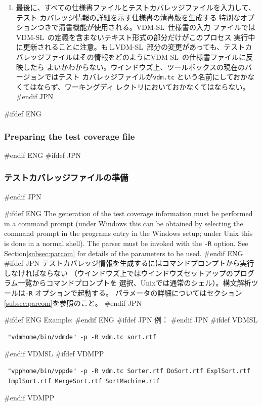 \documentclass[\pformat,12pt]{article}
\newcommand{\vdmslpp}{VDM-SL}
\newcommand{\vdmslpp}{VDM++}
\begin{document}
\begin{enumerate}
\item
  最後に、すべての仕様書ファイルとテストカバレッジファイルを入力して、テスト
  カバレッジ情報の詳細を示す仕様書の清書版を生成する
  特別なオプションつきで清書機能が使用される。\vdmslpp\ 仕様書の入力
  ファイルでは\vdmslpp\ の定義を含まないテキスト形式の部分だけがこのプロセス
  実行中に更新されることに注意。もし\vdmslpp\ 部分の変更があっても、テストカ
  バレッジファイルはその情報をどのように\vdmslpp\ の仕様書ファイルに反映したら
  よいかわからない。ウインドウズ上、ツールボックスの現在のバージョンではテスト
  カバレッジファイルが\texttt{vdm.tc} という名前にしておかなくてはならず、ワーキングディ
  レクトリにおいておかなくてはならない。
#endif JPN

\end{enumerate}


#ifdef ENG
\subsubsection{Preparing the test coverage file}
#endif ENG
#ifdef JPN
\subsubsection{テストカバレッジファイルの準備}
#endif JPN

#ifdef ENG
The generation of the test coverage information must be performed in a
command prompt (under Windows this can be obtained by selecting the
command prompt in the programs entry in the Windows setup; under
Unix this is done in a normal shell). The parser must be invoked with
 the {\tt -R} option. See
Section\ref{subsec:parcom} for details of the parameters to be used.
#endif ENG
#ifdef JPN
テストカバレッジ情報を生成するにはコマンドプロンプトから実行しなければならない
（ウインドウズ上ではウインドウズセットアップのプログラム一覧からコマンドプロンプトを
選択、Unixでは通常のシェル）。構文解析ツールは{\tt -R} オプションで起動する。
パラメータの詳細についてはセクション\ref{subsec:parcom}を参照のこと。
#endif JPN

#ifdef ENG
Example:
#endif ENG
#ifdef JPN
例：
#endif JPN
#ifdef VDMSL
\begin{verbatim}
 "vdmhome/bin/vdmde" -p -R vdm.tc sort.rtf
\end{verbatim}
#endif VDMSL
#ifdef VDMPP
\begin{verbatim}
 "vpphome/bin/vppde" -p -R vdm.tc Sorter.rtf DoSort.rtf ExplSort.rtf
 ImplSort.rtf MergeSort.rtf SortMachine.rtf
\end{verbatim}
#endif VDMPP
\end{document}
